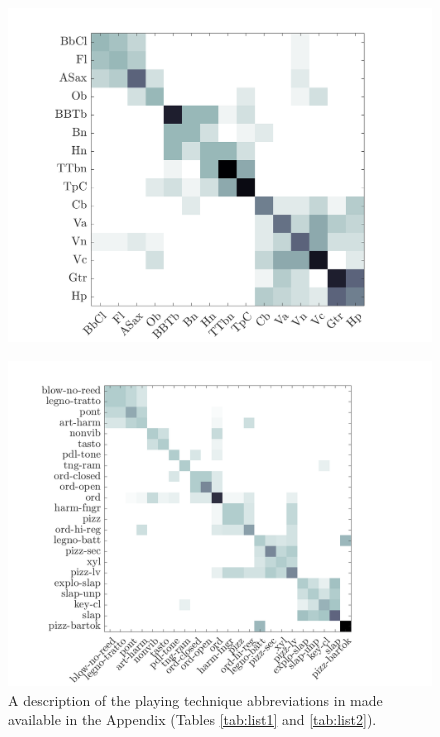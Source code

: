 \documentclass{bmcart}
\begin{document}
\begin{backmatter}
\begin{figure}
\center
\includegraphics[width = \textwidth]{figures/consensusVsI.png}
\caption{
}
\label{fig:consensusVsI}
\end{figure}

\begin{figure}
\center
\includegraphics[width = \textwidth]{figures/consensusVsPt.png}
\caption{A description of the playing technique abbreviations in made available in the Appendix (Tables \ref{tab:list1} and \ref{tab:list2}).
}
\label{fig:consensusVsPt}
\end{figure}


\end{backmatter}
\end{document}
